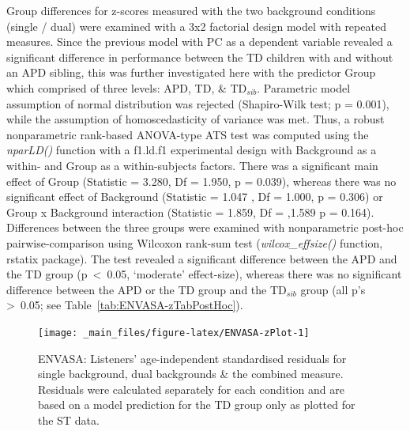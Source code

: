 \documentclass[a4paper, twoside]{templates/ociamthesis}
\begin{document}
Group differences for z-scores measured with the two background conditions (single / dual) were examined with a 3x2 factorial design model with repeated measures. Since the previous model with PC as a dependent variable revealed a significant difference in performance between the TD children with and without an APD sibling, this was further investigated here with the predictor Group which comprised of three levels: APD, TD, \& TD\(_{sib}\). Parametric model assumption of normal distribution was rejected (Shapiro-Wilk test; p = 0.001), while the assumption of homoscedasticity of variance was met. Thus, a robust nonparametric rank-based ANOVA-type ATS test was computed using the \emph{nparLD()} function with a f1.ld.f1 experimental design with Background as a within- and Group as a within-subjects factors. There was a significant main effect of Group (Statistic = 3.280, Df = 1.950, p = 0.039), whereas there was no significant effect of Background (Statistic = 1.047 , Df = 1.000, p = 0.306) or Group x Background interaction (Statistic = 1.859, Df = ,1.589 p = 0.164). Differences between the three groups were examined with nonparametric post-hoc pairwise-comparison using Wilcoxon rank-sum test (\emph{wilcox\_effsize()} function, rstatix package). The test revealed a significant difference between the APD and the TD group (p~\textless~0.05, `moderate' effect-size), whereas there was no significant difference between the APD or the TD group and the TD\(_{sib}\) group (all p's \textgreater~0.05; see Table~\ref{tab:ENVASA-zTabPostHoc}).

\begin{figure}

{\centering \texttt{[image: \_main\_files/figure-latex/ENVASA-zPlot-1]} 

}

\caption{ENVASA: Listeners' age-independent standardised residuals for single background, dual backgrounds \& the combined measure. Residuals were calculated separately for each condition and are based on a model prediction for the TD group only as plotted for the ST data.}\label{fig:ENVASA-zPlot}
\end{figure}
\end{document}
